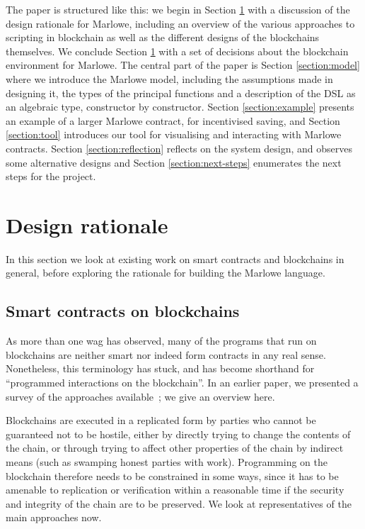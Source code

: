 \documentclass[
      acmsmall
    , screen
    , review=true
  ]{acmart}
\begin{document}
The paper is structured like this: we begin in Section \ref{section:design} with a discussion of the design rationale for Marlowe, including an overview of the various approaches to scripting in blockchain as well as the different designs of the blockchains themselves. We conclude Section \ref{section:design} with a set of decisions about the blockchain environment for Marlowe. The central part of the paper is Section \ref{section:model} where we introduce the Marlowe model, including the assumptions made in designing 
it, the types of the principal functions and a description of the DSL as an algebraic type, constructor by constructor. Section \ref{section:example} presents an example of a larger Marlowe contract, for incentivised saving, and Section \ref{section:tool} introduces our tool for visualising and interacting with Marlowe contracts.
Section \ref{section:reflection} reflects on the system design, and observes some alternative designs and Section \ref{section:next-steps} enumerates the next steps for the project.



\section{Design rationale}
\label{section:design}


\medskip
\noindent
In this section we look at existing work on smart contracts and blockchains in general, before exploring the rationale for building the Marlowe language.

\subsection{Smart contracts on blockchains}

As more than one wag has observed, many of the programs that run on blockchains are neither smart nor indeed form 
contracts in any real sense. Nonetheless, this terminology has stuck, and has become shorthand for ``programmed 
interactions on the blockchain''. In an earlier paper, we presented a survey of the approaches 
available~\cite{cryptoeprint:2016:1156}; we give an overview here.

Blockchains are executed in a replicated form by parties who cannot be guaranteed not to be hostile, either by directly trying to change the contents of the chain, or through trying to affect other properties of the chain by indirect means (such as swamping honest parties with work). Programming on the blockchain therefore needs to be constrained in some ways, since it has to be amenable to replication or verification within a reasonable time if the security and integrity of the chain are to be preserved. We look at representatives of the main approaches now.
\end{document}
